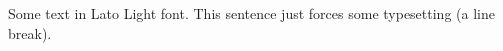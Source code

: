 \documentclass[12pt]{standalone}
\begin{document}
\selectfont
\begin{minipage}{3in}
Some text in Lato Light font.
This sentence just forces some typesetting 
(a line break).
\end{minipage}
\end{document}
